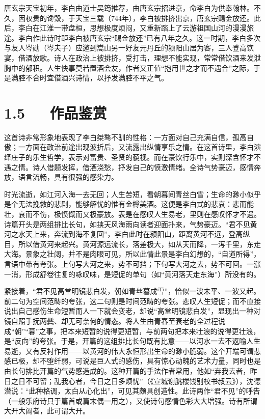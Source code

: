 \documentclass[letterpaper,12pt,english]{sphinxmanual}
\begin{document}
唐玄宗天宝初年，李白由道士吴筠推荐，由唐玄宗招进京，命李白为供奉翰林。不久，因权贵的谗毁，于天宝三载（744年），李白被排挤出京，唐玄宗赐金放还。此后，李白在江淮一带盘桓，思想极度烦闷，又重新踏上了云游祖国山河的漫漫旅途。李白作此诗时距李白被唐玄宗“赐金放还”已有八年之久。这一时期，李白多次与友人岑勋（岑夫子）应邀到嵩山另一好友元丹丘的颍阳山居为客，三人登高饮宴，借酒放歌。诗人在政治上被排挤，受打击，理想不能实现，常常借饮酒来发泄胸中的郁积。人生快事莫若置酒会友，作者又正值“抱用世之才而不遇合”之际，于是满腔不合时宜借酒兴诗情，以抒发满腔不平之气。


\section{1.5   作品鉴赏}
\label{\detokenize{p01_u6563_u6587/_u674e_u767d-_u5c06_u8fdb_u9152:id7}}
这首诗非常形象地表现了李白桀骜不驯的性格：一方面对自己充满自信，孤高自傲；一方面在政治前途出现波折后，又流露出纵情享乐之情。在这首诗里，李白演绎庄子的乐生哲学，表示对富贵、圣贤的藐视。而在豪饮行乐中，实则深含怀才不遇之情。诗人借题发挥，借酒浇愁，抒发自己的愤激情绪。全诗气势豪迈，感情奔放，语言流畅，具有很强的感染力。

时光流逝，如江河入海一去无回；人生苦短，看朝暮间青丝白雪；生命的渺小似乎是个无法挽救的悲剧，能够解忧的惟有金樽美酒。这便是李白式的悲哀：悲而能壮，哀而不伤，极愤慨而又极豪放。表是在感叹人生易老，里则在感叹怀才不遇。诗篇开头是两组排比长句，如挟天风海雨向读者迎面扑来，气势豪迈。“君不见黄河之水天上来，奔流到海不复回”，李白此时在颍阳山，距离黄河不远，登高纵目，所以借黄河来起兴。黄河源远流长，落差极大，如从天而降，一泻千里，东走大海。景象之壮阔，并不是肉眼可见，所以此情此景是李白幻想的，“自道所得”，言语中带有夸张。上句写大河之来，势不可挡；下句写大河之去，势不可回。一涨一消，形成舒卷往复的咏叹味，是短促的单句（如“黄河落天走东海”）所没有的。

紧接着，“君不见高堂明镜悲白发，朝如青丝暮成雪”，恰似一波未平、一波又起。前二句为空间范畴的夸张，这二句则是时间范畴的夸张。悲叹人生短促；而不直接说出自己感伤生命短暂而人一下就会变老，却说“高堂明镜悲白发”，显现出一种对镜自照手抚两鬓、却无可奈何的情态。将人生由青春至衰老的全过程说成“朝”“暮”之事，把本来短暂的说得更短暂，与前两句把本来壮浪的说得更壮浪，是“反向”的夸张。于是，开篇的这组排比长句既有比意——以河水一去不返喻人生易逝，又有反衬作用——以黄河的伟大永恒形出生命的渺小脆弱。这个开端可谓悲感已极，却不堕纤弱，可说是巨人式的感伤，具有惊心动魄的艺术力量，同时也是由长句排比开篇的气势感造成的。这种开篇的手法作者常用，他如“弃我去者，昨日之日不可留；乱我心者，今日之日多烦忧”（《宣城谢朓楼饯别校书叔云》），沈德潜说：“此种格调，太白从心化出”，可见其颇具创造性。此诗两作“君不见”的呼告（一般乐府诗只于篇首或篇末偶一用之），又使诗句感情色彩大大增强。诗有所谓大开大阖者，此可谓大开。
\end{document}

